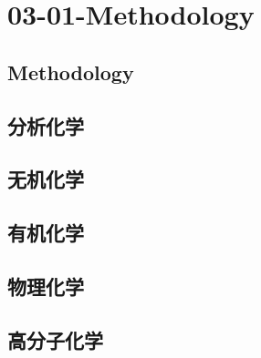 

\chapter{03-01-Methodology}


\section{Methodology}


\section{分析化学}

\section{无机化学}

\section{有机化学}

\section{物理化学}

\section{高分子化学}





